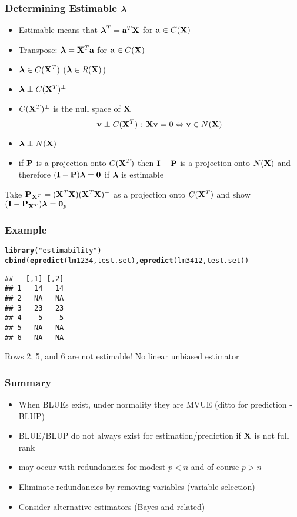 \documentclass{beamer}\usepackage[]{graphicx}\usepackage[]{color}
\makeatletter
\newcommand{\hlstr}[1]{\textcolor[rgb]{0.192,0.494,0.8}{#1}}%
\newcommand{\hlstd}[1]{\textcolor[rgb]{0.345,0.345,0.345}{#1}}%
\newcommand{\hlkwd}[1]{\textcolor[rgb]{0.737,0.353,0.396}{\textbf{#1}}}%
\newenvironment{kframe}{%
 \def\at@end@of@kframe{}%
 \ifinner\ifhmode%
  \def\at@end@of@kframe{\end{minipage}}%
  \begin{minipage}{\columnwidth}%
 \fi\fi%
 \def\FrameCommand##1{\hskip\@totalleftmargin \hskip-\fboxsep
 \colorbox{shadecolor}{##1}\hskip-\fboxsep
     \hskip-\linewidth \hskip-\@totalleftmargin \hskip\columnwidth}%
 \MakeFramed {\advance\hsize-\width
   \@totalleftmargin\z@ \linewidth\hsize
   \@setminipage}}%
 {\par\unskip\endMakeFramed%
 \at@end@of@kframe}
\newenvironment{knitrout}{}{} %
\makeatother
\begin{document}
\begin{frame} \frametitle{Determining Estimable $\lambdab$}
  \begin{itemize}

 \item Estimable means that $\lambdab^T = \a^T\X$  for $\a \in C(\X)$ \pause
 \item Transpose: $\lambdab = \X^T \a$  for $\a \in C(\X)$ \pause
 \item $\lambdab \in C(\X^T)$ ($\lambdab \in R(\X)$)\pause
 \item $\lambdab \perp C(\X^T)^{\perp}$ \pause
 \item $C(\X^T)^{\perp}$ is the null space of $\X$  \pause
$$ \v \perp C(\X^T): \, \X \v = 0 \Leftrightarrow \v \in N(\X)$$ \pause
\item $\lambdab \perp  N(\X)$ \pause
\item if $\P$ is a projection onto $C(\X^T)$ then $\I - \P$ is a projection
  onto $N(\X)$ and therefore $(\I - \P) \lambdab = \zero$ if $\lambdab$
  is estimable \pause
  \end{itemize}
\vfill
Take $\P_{\X^T} = (\X^T\X)(\X^T\X)^{-}$ as a projection onto $C(\X^T)$
and show $(\I - \P_{\X^T})\lambdab = \zero_p$
\end{frame}

\begin{frame}[fragile]\frametitle{Example}
\begin{knitrout}
\color{fgcolor}\begin{kframe}
\begin{alltt}
\hlkwd{library}\hlstd{(}\hlstr{"estimability"} \hlstd{)}
\hlkwd{cbind}\hlstd{(}\hlkwd{epredict}\hlstd{(lm1234, test.set),} \hlkwd{epredict}\hlstd{(lm3412, test.set))}
\end{alltt}
\begin{verbatim}
##   [,1] [,2]
## 1   14   14
## 2   NA   NA
## 3   23   23
## 4    5    5
## 5   NA   NA
## 6   NA   NA
\end{verbatim}
\end{kframe}
\end{knitrout}

Rows 2, 5, and 6 are not estimable!  No linear unbiased estimator


\end{frame}
\begin{frame} \frametitle{Summary}
  \begin{itemize}
  \item When BLUEs exist,  under normality they are MVUE  (ditto for
    prediction - BLUP) \pause
 \item BLUE/BLUP do not always exist for estimation/prediction if $\X$ is
   not full rank \pause
\item may occur with redundancies for modest $p < n$ and of course $p
  > n$ \pause
\item Eliminate redundancies by removing variables (variable
  selection) \pause
\item Consider alternative estimators (Bayes and related)
  \end{itemize}
\end{frame}
\end{document}
